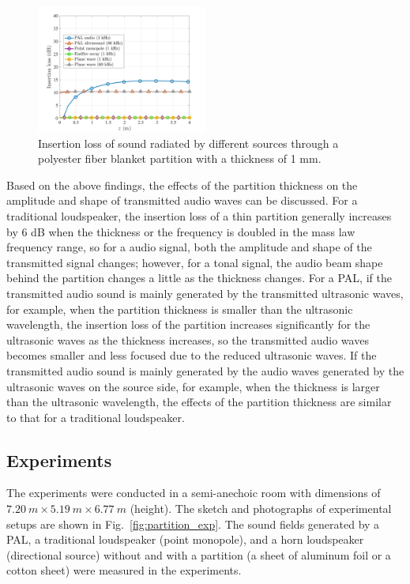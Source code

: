 \begin{figure}[!htb]
    \centering
    \includegraphics[width = 0.5\textwidth]{Figures/pending/CompareAxisIL_porous_thick1mm_190929A.jpg}
    \caption{Insertion loss of sound radiated by different sources through a polyester fiber blanket partition with a thickness of 1 mm.}
    \label{fig:partition_sim_1mm_porous}
\end{figure}

Based on the above findings, the effects of the partition thickness on the amplitude and shape of transmitted audio waves can be discussed. 
For a traditional loudspeaker, the insertion loss of a thin partition generally increases by 6 dB when the thickness or the frequency is doubled in the mass law frequency range, so for a  audio signal, both the amplitude and shape of the transmitted signal changes; however, for a tonal signal, the audio beam shape behind the partition changes a little as the thickness changes. 
For a PAL, if the transmitted audio sound is mainly generated by the transmitted ultrasonic waves, for example, when the partition thickness is smaller than the ultrasonic wavelength, the insertion loss of the partition increases significantly for the ultrasonic waves as the thickness increases, so the transmitted audio waves becomes smaller and less focused due to the reduced ultrasonic waves. 
If the transmitted audio sound is mainly generated by the audio waves generated by the ultrasonic waves on the source side, for example, when the thickness is larger than the ultrasonic wavelength, the effects of the partition thickness are similar to that for a traditional loudspeaker.

\subsection{Experiments}

The experiments were conducted in a semi-anechoic room with dimensions of $\SI{7.20}{m} \times\SI{ 5.19}{ m}\times \SI{6.77}{ m }$ (height). 
The sketch and photographs of experimental setups are shown in Fig.~\ref{fig:partition_exp}.
The sound fields generated by a PAL, a traditional loudspeaker (point monopole), and a horn loudspeaker (directional source) without and with a partition (a sheet of aluminum foil or a cotton sheet) were measured in the experiments.

